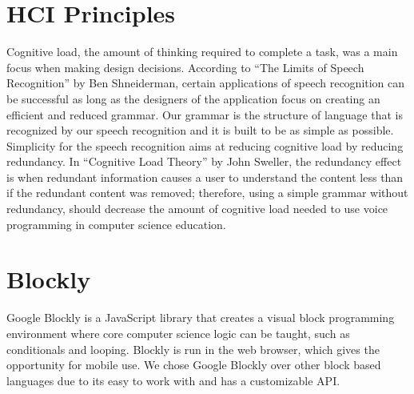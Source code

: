 \documentclass[]{article}
\begin{document}

\section{HCI Principles}
Cognitive load, the amount of thinking required to complete a task, was a main focus when
making design decisions. According to ``The Limits of Speech Recognition'' by Ben Shneiderman, certain
applications of speech recognition can be successful as long as the designers of the application 
focus on creating an efficient and reduced grammar. Our grammar is the structure of language that is 
recognized by our speech recognition and it is built to be as simple as possible. Simplicity for the
speech recognition aims at reducing cognitive load by reducing redundancy. In ``Cognitive Load Theory''
by John Sweller, the redundancy effect is when redundant information causes a user to understand the content
less than if the redundant content was removed; therefore, using a simple grammar without redundancy,
should decrease the amount of cognitive load needed to use voice programming in computer science education.

\section{Blockly}
Google Blockly is a JavaScript library that creates a visual block programming 
environment where core computer science logic can be taught, such as conditionals and 
looping. Blockly is run in the web browser, which gives the opportunity for mobile use. 
We chose Google Blockly over other block based languages due to its easy to work with and 
has a customizable API.
\end{document}
